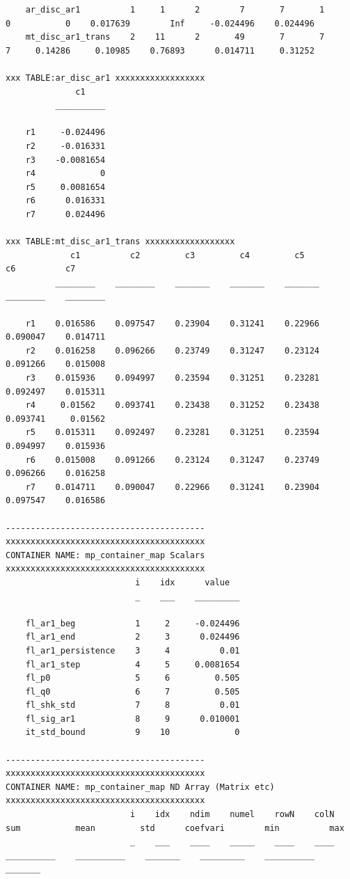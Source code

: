 \documentclass[
]{book}
\begin{document}
\begin{verbatim}
    ar_disc_ar1          1     1      2        7       7       1       0           0    0.017639        Inf     -0.024496    0.024496
    mt_disc_ar1_trans    2    11      2       49       7       7       7     0.14286     0.10985    0.76893      0.014711     0.31252

xxx TABLE:ar_disc_ar1 xxxxxxxxxxxxxxxxxx
              c1    
          __________

    r1     -0.024496
    r2     -0.016331
    r3    -0.0081654
    r4             0
    r5     0.0081654
    r6      0.016331
    r7      0.024496

xxx TABLE:mt_disc_ar1_trans xxxxxxxxxxxxxxxxxx
             c1          c2         c3         c4         c5          c6          c7   
          ________    ________    _______    _______    _______    ________    ________

    r1    0.016586    0.097547    0.23904    0.31241    0.22966    0.090047    0.014711
    r2    0.016258    0.096266    0.23749    0.31247    0.23124    0.091266    0.015008
    r3    0.015936    0.094997    0.23594    0.31251    0.23281    0.092497    0.015311
    r4     0.01562    0.093741    0.23438    0.31252    0.23438    0.093741     0.01562
    r5    0.015311    0.092497    0.23281    0.31251    0.23594    0.094997    0.015936
    r6    0.015008    0.091266    0.23124    0.31247    0.23749    0.096266    0.016258
    r7    0.014711    0.090047    0.22966    0.31241    0.23904    0.097547    0.016586

----------------------------------------
xxxxxxxxxxxxxxxxxxxxxxxxxxxxxxxxxxxxxxxx
CONTAINER NAME: mp_container_map Scalars
xxxxxxxxxxxxxxxxxxxxxxxxxxxxxxxxxxxxxxxx
                          i    idx      value  
                          _    ___    _________

    fl_ar1_beg            1     2     -0.024496
    fl_ar1_end            2     3      0.024496
    fl_ar1_persistence    3     4          0.01
    fl_ar1_step           4     5     0.0081654
    fl_p0                 5     6         0.505
    fl_q0                 6     7         0.505
    fl_shk_std            7     8          0.01
    fl_sig_ar1            8     9      0.010001
    it_std_bound          9    10             0

----------------------------------------
xxxxxxxxxxxxxxxxxxxxxxxxxxxxxxxxxxxxxxxx
CONTAINER NAME: mp_container_map ND Array (Matrix etc)
xxxxxxxxxxxxxxxxxxxxxxxxxxxxxxxxxxxxxxxx
                         i    idx    ndim    numel    rowN    colN       sum           mean         std      coefvari        min          max  
                         _    ___    ____    _____    ____    ____    __________    __________    _______    _________    __________    _______


\end{verbatim}
\end{document}
